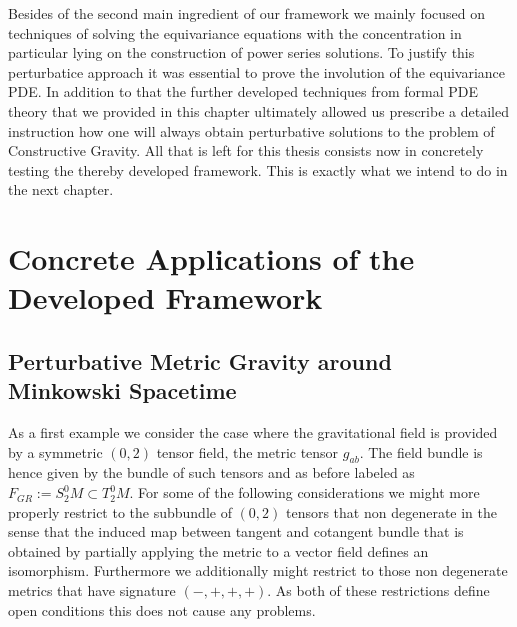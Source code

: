 \documentclass[a4paper,12pt, DIV=14, BCOR=5mm, twoside, headsepline, numbers=noenddot]{scrbook}
\begin{document}
Besides of the second main ingredient of our framework we mainly focused on techniques of solving the equivariance equations with the concentration in particular lying on the construction of power series solutions. To justify this perturbatice approach it was essential to prove the involution of the equivariance PDE. In addition to that the further developed techniques from formal PDE theory that we provided in this chapter ultimately allowed us prescribe a detailed instruction how one will always obtain perturbative solutions to the problem of Constructive Gravity.  All that is left for this thesis consists now in concretely testing the thereby developed framework. This is exactly what we intend to do in the next chapter.


\chapter{Concrete Applications of the Developed Framework}
\section{Perturbative Metric Gravity around Minkowski Spacetime}
As a first example we consider the case where the gravitational field is provided by a symmetric $(0,2)$ tensor field, the metric tensor $g_{ab}$. The field bundle is hence given by the bundle of such tensors and as before labeled as $F_{GR} := S^0_2M \subset T^0_2M$. For some of the following considerations we might more properly restrict to the subbundle of $(0,2)$ tensors that non degenerate in the sense that the induced map between tangent and cotangent bundle that is obtained by partially applying the metric to a vector field defines an isomorphism. Furthermore we additionally might restrict to those non degenerate metrics that have signature $(-,+,+,+)$. As both of these restrictions define open conditions this does not cause any problems.
\end{document}
